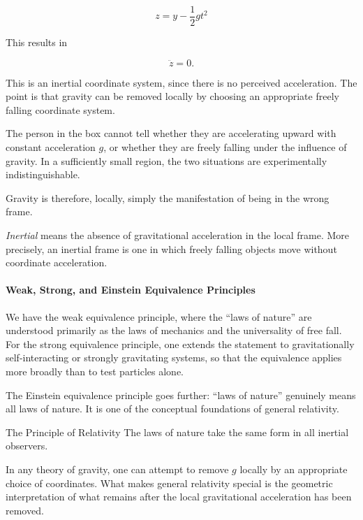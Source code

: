 		\begin{equation}
			z = y - \frac{1}{2}gt^2
		\end{equation}

		This results in

		\begin{equation}
			\ddot{z} = 0.
		\end{equation}

		This is an inertial coordinate system, since there is no perceived acceleration. The point is that gravity can be removed locally by choosing an appropriate freely falling coordinate system.

		The person in the box cannot tell whether they are accelerating upward with constant acceleration $g$, or whether they are freely falling under the influence of gravity. In a sufficiently small region, the two situations are experimentally indistinguishable.

		Gravity is therefore, locally, simply the manifestation of being in the wrong frame.

		\textit{Inertial} means the absence of gravitational acceleration in the local frame. More precisely, an inertial frame is one in which freely falling objects move without coordinate acceleration.

		\paragraph{Weak, Strong, and Einstein Equivalence Principles}

			We have the weak equivalence principle, where the ``laws of nature'' are understood primarily as the laws of mechanics and the universality of free fall.
			For the strong equivalence principle, one extends the statement to gravitationally self-interacting or strongly gravitating systems, so that the equivalence applies more broadly than to test particles alone.

			The Einstein equivalence principle goes further: ``laws of nature'' genuinely means all laws of nature. It is one of the conceptual foundations of general relativity.
			\begin{theorem}{The Principle of Relativity}
				\label{thm:principle_of_relativity}
			    The laws of nature take the same form in all inertial observers.
			\end{theorem}
			
			In any theory of gravity, one can attempt to remove $g$ locally by an appropriate choice of coordinates. What makes general relativity special is the geometric interpretation of what remains after the local gravitational acceleration has been removed.

